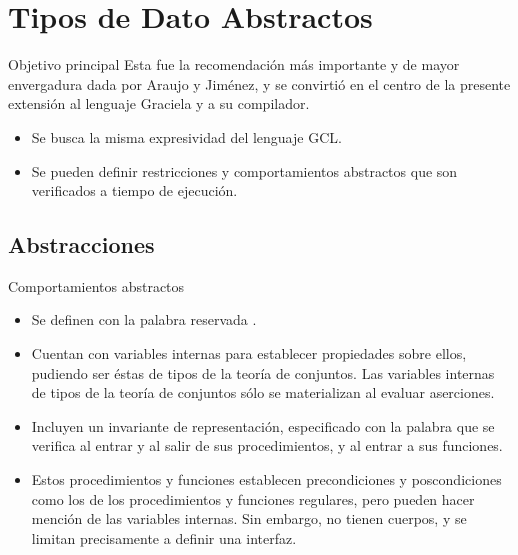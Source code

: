 \section{Tipos de Dato Abstractos}

\begin{frame}{Objetivo principal}
Esta fue la recomendación más importante y de mayor envergadura dada por Araujo y Jiménez, y se convirtió en el centro de la presente extensión al lenguaje Graciela y a su compilador.

\begin{itemize}
  \item Se busca la misma expresividad del lenguaje GCL.
  \item Se pueden definir restricciones y comportamientos abstractos que son verificados a tiempo de ejecución.
\end{itemize}
\end{frame}

\subsection*{Abstracciones}

\begin{frame}{Comportamientos abstractos}
\begin{itemize}
  \item Se definen con la palabra reservada .
  \item Cuentan con variables internas para establecer propiedades sobre ellos, pudiendo ser éstas de tipos de la teoría de conjuntos. Las variables internas de tipos de la teoría de conjuntos sólo se materializan al evaluar aserciones.
  \item Incluyen un invariante de representación, especificado con la palabra  que se verifica al entrar y al salir de sus procedimientos, y al entrar a sus funciones.
  \item Estos procedimientos y funciones establecen
  precondiciones y poscondiciones como los de los procedimientos y funciones regulares, pero pueden hacer mención de las variables internas. Sin embargo, no tienen cuerpos, y se limitan precisamente a definir una interfaz.
\end{itemize}
\end{frame}

